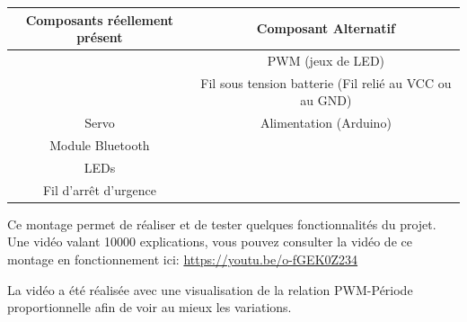   			\begin{table}[hb]\begin{center}
	  			\begin{tabular}{c|c}
	  			Composants réellement présent & Composant Alternatif\\
	  			\hline
	  			\pic & PWM (jeux de LED) \\ 
	  			\dspic & Fil sous tension batterie (Fil relié au VCC ou au GND)\\
	  			 Servo &  Alimentation (Arduino) \\
	  			 Module Bluetooth &\\ 
	  			 LEDs &\\
	  			 Fil d'arrêt d'urgence &\\
	  			
	  			\end{tabular}\end{center}
  			\end{table}
 Ce montage permet de réaliser et de tester quelques fonctionnalités du projet. Une vidéo valant 10000 explications, vous pouvez consulter la vidéo de ce montage en fonctionnement ici: \url{ https://youtu.be/o-fGEK0Z234}
\begin{tcolorbox}[center,width=0.9\textwidth, colframe=red!90!orange, colback=orange!25, arc=3mm,boxrule=1mm, sharp corners=east,title=Note]
			La vidéo a été réalisée avec une visualisation de la relation PWM-Période proportionnelle afin de voir au mieux les variations.
  			\end{tcolorbox}
